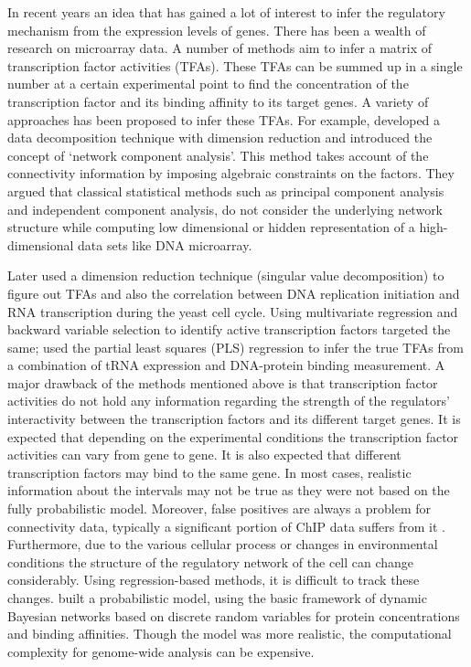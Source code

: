 In recent years an idea that has gained a lot of interest to infer the regulatory mechanism from the expression levels of genes. There has been a wealth of research on microarray data. A number of methods \cite{Alter:2004, Gao:2004, Liao:2003} aim to infer a matrix of transcription factor activities (TFAs). These TFAs can be summed up in a single number at a certain experimental point to find the concentration of the transcription factor and its binding affinity to its target genes. A variety of approaches has been proposed to infer these TFAs. For example, \cite{Liao:2003} developed a data decomposition technique with dimension reduction and introduced the concept of ‘network component analysis’. This method takes account of the connectivity information by imposing algebraic constraints on the factors. They argued that classical statistical methods such as principal component analysis and independent component analysis, do not consider the underlying network structure while computing low dimensional or hidden representation of a high-dimensional data sets like DNA microarray. 

Later \cite{Alter:2004} used a dimension reduction technique (singular value decomposition) to figure out TFAs and also the correlation between DNA replication initiation and RNA transcription during the yeast cell cycle. Using multivariate regression and backward variable selection to identify active transcription factors \cite{Gao:2004} targeted the same; \cite{Boulesteix:2005} used the partial least squares (PLS) regression to infer the true TFAs from a combination of tRNA expression and DNA-protein binding measurement. A major drawback of the methods mentioned above is that transcription factor activities do not hold any information regarding the strength of the regulators' interactivity between the transcription factors and its different target genes. It is expected that depending on the experimental conditions the transcription factor activities can vary from gene to gene. It is also expected that different transcription factors may bind to the same gene. In most cases, realistic information about the intervals may not be true as they were not based on the fully probabilistic model. Moreover, false positives are always a problem for connectivity data, typically a significant portion of ChIP data suffers from it \cite{Boulesteix:2005}. Furthermore, due to the various cellular process or changes in environmental conditions the structure of the regulatory network of the cell can change considerably. Using regression-based methods, it is difficult to track these changes. \cite{Nachman:2004} built a probabilistic model, using the basic framework of dynamic Bayesian networks based on discrete random variables for protein concentrations and binding affinities. Though the model was more realistic, the computational complexity for genome-wide analysis can be expensive.

